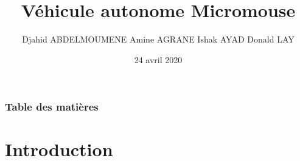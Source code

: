 \documentclass{beamer}
\title[Micromouse]{Véhicule autonome Micromouse} %
\author[]{
    Djahid ABDELMOUMENE \break
    Amine AGRANE \break
    Ishak AYAD \break
    Donald LAY 
} %
\institute[CYU] %
{
Tuteur technique: M. Alexandre PITTI \\
Encadrant de gestion de projet: M. Tianxiao LIU \\
\medskip
Master IISC - UE Projet de Synthèse \\
\medskip
CY Cergy-Paris Université %
\medskip

}
\date{24 avril 2020} %
\begin{document}
\begin{frame}
\titlepage %
\end{frame}

\begin{frame}
\frametitle{Table des matières} %
\tableofcontents[]  %
\end{frame}


\section{Introduction}
\end{document}
